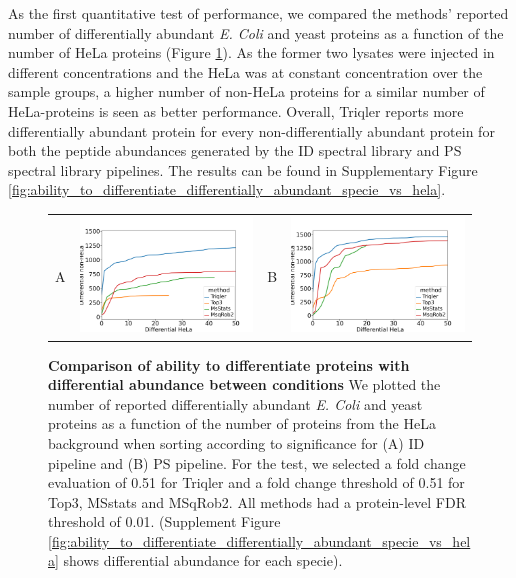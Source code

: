 \documentclass[10pt,letterpaper]{article}
\begin{document}
As the first quantitative test of performance, we compared the methods' reported number of differentially abundant {\em E. Coli} and yeast proteins as a function of the number of HeLa proteins (Figure \ref{fig:diff_vs_hela}). As the former two lysates were injected in different concentrations and the HeLa was at constant concentration over the sample groups, a higher number of non-HeLa proteins for a similar number of HeLa-proteins is seen as better performance.  Overall, Triqler reports more differentially abundant protein for every non-differentially abundant protein for both the peptide abundances generated by the ID spectral library and PS spectral library pipelines. The results can be found in Supplementary Figure \ref{fig:ability_to_differentiate_differentially_abundant_specie_vs_hela}. 

\begin{figure}[hbt]
    \centering
    \begin{tabular}{lclc} 
        A & \includegraphics[width=0.45\linewidth]{../../result/report_plots_pipeline/diff_HeLa_vs_nonHeLa_ID_all_0.51.png} & 
        B & \includegraphics[width=0.45\linewidth]{../../result/report_plots_pipeline/diff_HeLa_vs_nonHeLa_PS_all_0.51.png} \\
    \end{tabular} 
    \caption{{\bf Comparison of ability to differentiate proteins with differential abundance between conditions} We plotted the number of reported differentially abundant  {\em E. Coli} and yeast proteins as a function of the number of proteins from the HeLa background when sorting according to significance for (A) ID pipeline and (B) PS pipeline. For the test, we selected a fold change evaluation of 0.51 for Triqler and a fold change threshold of 0.51 for Top3, MSstats and MSqRob2. All methods had a protein-level FDR threshold of 0.01. (Supplement Figure \ref{fig:ability_to_differentiate_differentially_abundant_specie_vs_hela} shows differential abundance for each specie). \label{fig:diff_vs_hela}}
\end{figure}
\end{document}
